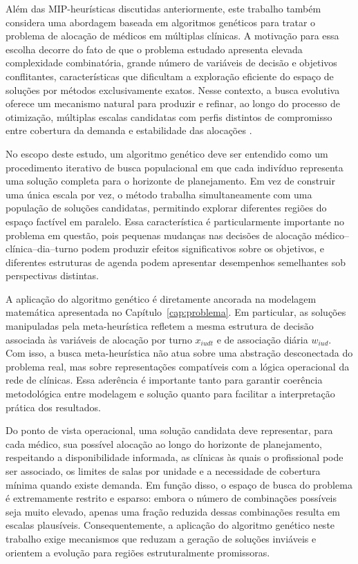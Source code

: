 Além das MIP-heurísticas discutidas anteriormente, este trabalho também considera uma abordagem baseada em algoritmos genéticos para tratar o problema de alocação de médicos em múltiplas clínicas. A motivação para essa escolha decorre do fato de que o problema estudado apresenta elevada complexidade combinatória, grande número de variáveis de decisão e objetivos conflitantes, características que dificultam a exploração eficiente do espaço de soluções por métodos exclusivamente exatos. Nesse contexto, a busca evolutiva oferece um mecanismo natural para produzir e refinar, ao longo do processo de otimização, múltiplas escalas candidatas com perfis distintos de compromisso entre cobertura da demanda e estabilidade das alocações \cite{Hamid_Tavakkoli_Moghaddam_Golpaygani_Vahedi_Nouri_2020,Tan_Gan_Ren_2019}.

No escopo deste estudo, um algoritmo genético deve ser entendido como um procedimento iterativo de busca populacional em que cada indivíduo representa uma solução completa para o horizonte de planejamento. Em vez de construir uma única escala por vez, o método trabalha simultaneamente com uma população de soluções candidatas, permitindo explorar diferentes regiões do espaço factível em paralelo. Essa característica é particularmente importante no problema em questão, pois pequenas mudanças nas decisões de alocação médico--clínica--dia--turno podem produzir efeitos significativos sobre os objetivos, e diferentes estruturas de agenda podem apresentar desempenhos semelhantes sob perspectivas distintas.

A aplicação do algoritmo genético é diretamente ancorada na modelagem matemática apresentada no Capítulo~\ref{cap:problema}. Em particular, as soluções manipuladas pela meta-heurística refletem a mesma estrutura de decisão associada às variáveis de alocação por turno $x_{iudt}$ e de associação diária $w_{iud}$. Com isso, a busca meta-heurística não atua sobre uma abstração desconectada do problema real, mas sobre representações compatíveis com a lógica operacional da rede de clínicas. Essa aderência é importante tanto para garantir coerência metodológica entre modelagem e solução quanto para facilitar a interpretação prática dos resultados.

Do ponto de vista operacional, uma solução candidata deve representar, para cada médico, sua possível alocação ao longo do horizonte de planejamento, respeitando a disponibilidade informada, as clínicas às quais o profissional pode ser associado, os limites de salas por unidade e a necessidade de cobertura mínima quando existe demanda. Em função disso, o espaço de busca do problema é extremamente restrito e esparso: embora o número de combinações possíveis seja muito elevado, apenas uma fração reduzida dessas combinações resulta em escalas plausíveis. Consequentemente, a aplicação do algoritmo genético neste trabalho exige mecanismos que reduzam a geração de soluções inviáveis e orientem a evolução para regiões estruturalmente promissoras.

